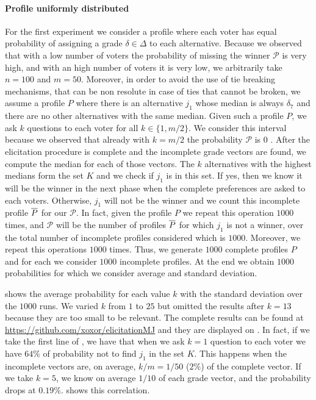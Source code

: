	\paragraph{Profile uniformly distributed}
	For the first experiment we consider a profile where each voter has equal probability of assigning a grade $\delta \in \Delta$ to each alternative. Because we observed that with a low number of voters the probability of missing the winner $\mathcal{P}$ is very high, and with an high number of voters it is very low, we arbitrarily take $n=100$ and $m=50$. Moreover, in order to avoid the use of tie breaking mechanisms, that can be non resolute in case of ties that cannot be broken, we assume a profile $P$ where there is an alternative $j_1$ whose median is always $\delta_7$ and there are no other alternatives with the same median. 
	Given such a profile $P$, we ask $k$ questions to each voter for all $k\in \{1,m/2\}$. We consider this interval because we observed that already with $k=m/2$ the probability $\mathcal{P}$ is $0$ . After the elicitation procedure is complete and the incomplete grade vectors are found, we compute the median for each of those vectors. The $k$ alternatives with the highest medians form the set $K$ and we check if $j_1$ is in this set. If yes, then we know it will be the winner in the next phase when the complete preferences are asked to each voters. Otherwise, $j_1$ will not be the winner and we count this incomplete profile $\overline{P}$ for our $\mathcal{P}$. In fact, given the profile $P$ we repeat this operation $1000$ times, and $\mathcal{P}$ will be the number of profiles $\overline{P}$ for which $j_1$ is not a winner, over the total number of incomplete profiles considered which is $1000$. 
	Moreover, we repeat this operations $1000$ times. Thus, we generate $1000$ complete profiles $P$ and for each we consider $1000$ incomplete profiles. At the end we obtain $1000$ probabilities for which we consider average and standard deviation.
	
	 shows the average probability for each value $k$ with the standard deviation over the $1000$ runs. We varied $k$ from $1$ to $25$ but omitted the results after $k=13$ because they are too small to be relevant. The complete results can be found at \url{https://github.com/xoxor/elicitationMJ} and they are displayed on . 
	In fact, if we take the first line of , we have that when we ask $k=1$ question to each voter we have $64\%$ of probability not to find $j_1$ in the set $K$. This happens when the incomplete vectors are, on average, $k/m=1/50$ ($2\%$) of the complete vector. If we take $k=5$, we know on average $1/10$ of each grade vector, and the probability drops at $0.19\%$.  shows this correlation.
	
